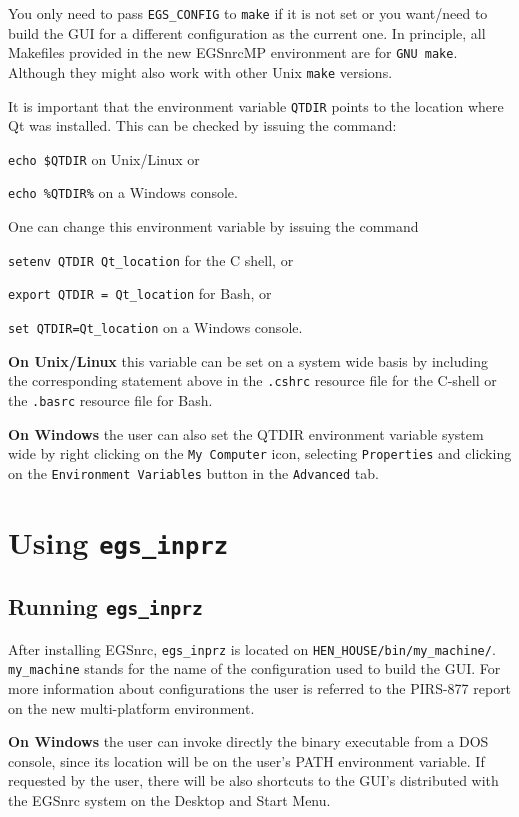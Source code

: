 \documentclass[12pt,twoside]{article}   %
\begin{document}
 You only need to pass {\tt EGS\_CONFIG} to {\tt make} if it is not set
or you want/need to build the GUI for a different configuration as the current one. 
In principle, all Makefiles provided in the new EGSnrcMP environment are for {\tt GNU make}.
Although they might also work with other Unix {\tt make} versions.

It is important that the environment variable {\tt QTDIR} points to the location where 
Qt was installed. This can be checked by issuing the command:

      {\tt echo \$QTDIR} on Unix/Linux or

      {\tt echo \%QTDIR\%} on a Windows console.
      
One can change this environment variable by issuing the command

      {\tt setenv QTDIR Qt\_location} for the C shell, or

      {\tt export QTDIR = Qt\_location} for Bash, or

      {\tt set QTDIR=Qt\_location} on a Windows console.

{\bf On Unix/Linux} this variable can be set on a system wide basis by including the 
corresponding statement above in the {\tt .cshrc} resource file for the C-shell or 
the {\tt .basrc} resource file for Bash.

{\bf On Windows} the user can also set the QTDIR environment variable system wide by
right clicking on the {\tt My Computer} icon, selecting {\tt Properties} and clicking on the
{\tt Environment Variables} button in the {\tt Advanced} tab.
  
\newpage
\section{Using {\tt egs\_inprz}}
\subsection{Running {\tt egs\_inprz}}

After installing EGSnrc, {\tt egs\_inprz} is located on {\tt HEN\_HOUSE/bin/my\_machine/}.
{\tt my\_machine} stands for the name of the configuration used to build the GUI. For more
information about configurations the user is referred to the PIRS-877 report on the new
multi-platform environment\cite{Ka03}.

{\bf On Windows} the user can invoke directly the binary executable from a DOS console, since its 
location will be on the user's PATH environment variable. If requested by the user, there will
be also shortcuts to the GUI's distributed with the EGSnrc system on the Desktop and 
Start Menu.
\end{document}
